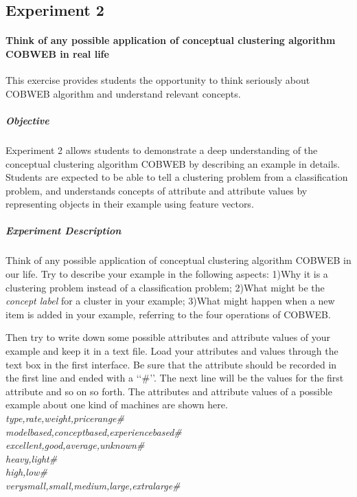  \subsection{Experiment 2}
 \paragraph{Think of any possible application of conceptual clustering algorithm COBWEB in real life} This exercise provides students the opportunity to think seriously about COBWEB algorithm and understand relevant concepts. 
 \subparagraph{Objective} Experiment 2 allows students to demonstrate a deep understanding of the conceptual clustering algorithm COBWEB by describing an example in details. Students are expected to be able to tell a clustering problem from a classification problem, and understands concepts of attribute and attribute values by representing objects in their example using feature vectors.
 \subparagraph{Experiment Description} Think of any possible application of conceptual clustering algorithm COBWEB in our life. Try to describe your example in the following aspects: 1)Why it is a clustering problem instead of a classification problem; 2)What might be the \emph{concept label} for a cluster in your example; 3)What might happen when a new item is added in your example, referring to the four operations of COBWEB.
 
 Then try to write down some possible attributes and attribute values of your example and keep it in a text file. Load your attributes and values through the text box in the first interface. Be sure that the attribute should be recorded in the first line and ended with a \lq\lq{\#}\rq\rq. The next line will be the values for the first attribute and so on so forth. The attributes and attribute values of a possible example about one kind of machines are shown here.\\
 \emph{type,rate,weight,pricerange\#\\
 modelbased,conceptbased,experiencebased\#\\
 excellent,good,average,unknown\#\\
 heavy,light\#\\
 high,low\#\\
 verysmall,small,medium,large,extralarge\#\\}
 
